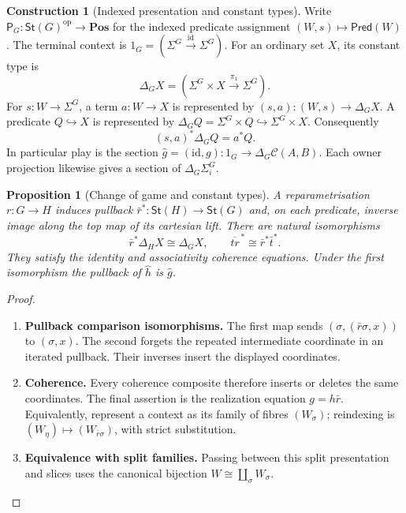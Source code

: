 \documentclass[11pt,a4paper]{article}
\numberwithin{equation}{section}
\newtheorem{proposition}[theorem]{Proposition}
\theoremstyle{definition}
\newtheorem{construction}[construction]{Construction}
\theoremstyle{remark}
\theoremstyle{plain}
\begin{document}
\begin{construction}[Indexed presentation and constant types]
\label{con:fib-constants}
Write $\mathsf P_G:\mathsf{St}(G)^{\mathrm{op}}\to\mathbf{Pos}$
for the indexed predicate assignment $(W,s)\mapsto\mathsf{Pred}(W)$.
The terminal context is $1_G=(\Sigma^G\xrightarrow{\mathrm{id}}\Sigma^G)$.
For an ordinary set $X$, its constant type is
\[
 \Delta_GX=(\Sigma^G\times X\xrightarrow{\pi_1}\Sigma^G).
\]
For $s:W\to\Sigma^G$, a term $a:W\to X$ is represented by
$(s,a):(W,s)\to\Delta_GX$. A predicate $Q\hookrightarrow X$ is
represented by $\Delta_GQ=\Sigma^G\times Q\hookrightarrow\Sigma^G\times X$.
Consequently
\begin{equation}\label{eq:fib-constant-test}
 (s,a)^*\Delta_GQ=a^*Q.
\end{equation}
In particular play is the section
$\widehat g=(\mathrm{id},g):1_G\to\Delta_G\mathcal C(A,B)$.
Each owner projection likewise gives a section of
$\Delta_G\Sigma_i^G$.
\end{construction}

\begin{proposition}[Change of game and constant types]
\label{prop:fib-basechange}
A reparametrisation $r:G\to H$ induces pullback
$\bar r^*:\mathsf{St}(H)\to\mathsf{St}(G)$ and, on each predicate,
inverse image along the top map of its cartesian lift. There are natural
isomorphisms
\[
 \bar r^*\Delta_HX\cong\Delta_GX,
 \qquad \overline{tr}^{\,*}\cong\bar r^*\bar t^*.
\]
They satisfy the identity and associativity coherence equations. Under
the first isomorphism the pullback of $\widehat h$ is $\widehat g$.
\end{proposition}
\begin{proof}
\leavevmode
\begin{enumerate}[label=\textup{(\arabic*)},leftmargin=*,itemsep=4pt,topsep=3pt]
  \item \textbf{Pullback comparison isomorphisms.} The first map sends $(\sigma,(\bar r\sigma,x))$ to $(\sigma,x)$. The second forgets the repeated intermediate coordinate in an iterated
pullback. Their inverses insert the displayed coordinates.
  \item \textbf{Coherence.} Every
coherence composite therefore inserts or deletes the same coordinates. The final assertion is the realization equation $g=h\bar r$. Equivalently, represent a context as its family of fibres $(W_\sigma)$;
reindexing is $(W_\eta)\mapsto(W_{\bar r\sigma})$, with strict
substitution.
  \item \textbf{Equivalence with split families.} Passing between this split presentation and slices uses
the canonical bijection $W\cong\coprod_\sigma W_\sigma$.
\end{enumerate}
\end{proof}
\end{document}
